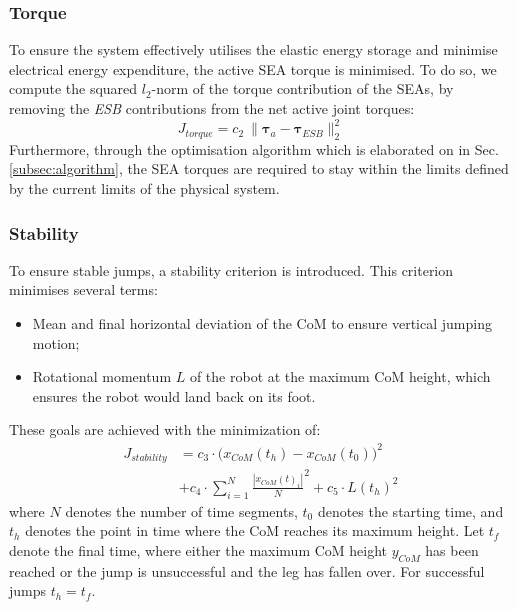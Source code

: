 \documentclass[letterpaper, 10 pt, conference]{ieeeconf}  %
\begin{document}
\subsubsection{Torque}
To ensure the system effectively utilises the elastic energy storage and minimise electrical energy expenditure, the active SEA torque is minimised. To do so, we compute the squared $l_2$-norm of the torque contribution of the SEAs, by removing the \textit{ESB} contributions from the net active joint torques:
\begin{equation}
	J_{torque}= c_2 \: \| \boldsymbol{\tau}_a - \boldsymbol{\tau}_{ESB} \|_2^2
\end{equation}
Furthermore, through the optimisation algorithm which is elaborated on in Sec. \ref{subsec:algorithm}, the SEA torques are required to stay within the limits defined by the current limits of the physical system.

\subsubsection{Stability}
To ensure stable jumps, a stability criterion is introduced. This criterion minimises several terms:
\begin{itemize}
	\item Mean and final horizontal deviation of the CoM to ensure vertical jumping motion;
	\item Rotational momentum $L$ of the robot at the maximum CoM height, which ensures the robot would land back on its foot.
\end{itemize}
These goals are achieved with the minimization of:
\begin{equation}
	\begin{aligned}
		J_{stability} & =  c_3\cdot \Big( x_{CoM}(t_h)-x_{CoM}(t_0) \Big)^2  \\ & +c_4\cdot  {\sum^{N}_{i=1}\frac{| x_{CoM}(t)_i |}{N}}^2   
				  			+ c_5  \cdot   L(t_h)^2 
	\end{aligned}
\end{equation}
where $N$ denotes the number of time segments, $t_0$ denotes the starting time, and $t_h$ denotes the point in time where the CoM reaches its maximum height. Let $t_f$ denote the final time, where either the maximum CoM height $y_{CoM}$ has been reached or the jump is unsuccessful and the leg has fallen over. For successful jumps $t_h=t_f$.
\end{document}
